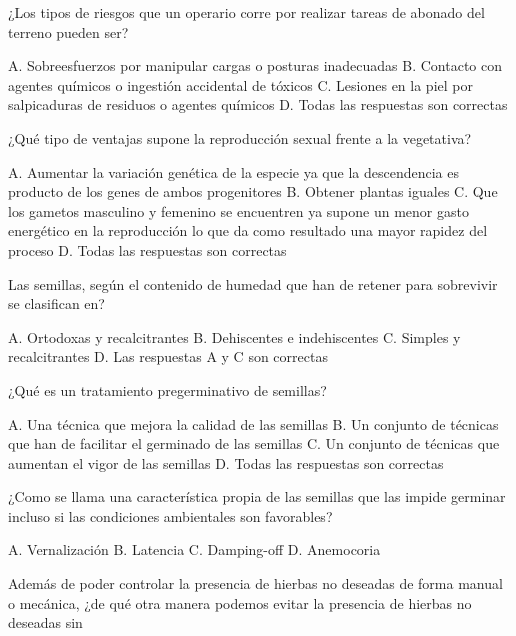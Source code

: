 \documentclass[11pt]{exam}
\begin{document}
{\begin{questions}
  \question ¿Los tipos de riesgos que un operario corre por  realizar tareas de abonado del
  terreno pueden ser?
  \begin{checkboxes}
    \choice A. Sobreesfuerzos por manipular cargas o posturas inadecuadas
    \choice B. Contacto con agentes químicos o ingestión accidental de tóxicos
    \choice C. Lesiones en la piel por salpicaduras de residuos o agentes químicos
    \CorrectChoice D. Todas las respuestas son correctas
  \end{checkboxes}
  \question ¿Qué tipo de ventajas supone la reproducción sexual frente a la
  vegetativa?
  \begin{checkboxes}
    \CorrectChoice A. Aumentar la variación genética de la especie ya que la
    descendencia es producto de los genes de ambos progenitores
    \choice B. Obtener plantas iguales
    \choice C. Que los gametos masculino y femenino se encuentren ya supone 
    un menor gasto energético en la reproducción lo que da como resultado una
    mayor rapidez del proceso
    \choice D. Todas las respuestas son correctas 
  \end{checkboxes}
  \question Las semillas, según el contenido de humedad que han de retener para
  sobrevivir se clasifican en?
  \begin{checkboxes}
    \CorrectChoice A. Ortodoxas y recalcitrantes
    \choice B. Dehiscentes e indehiscentes
    \choice C. Simples y recalcitrantes
    \choice D. Las respuestas A y C son correctas
  \end{checkboxes}
  \question ¿Qué es un tratamiento pregerminativo de semillas?
  \begin{checkboxes}
    \choice A. Una técnica que mejora la calidad de las semillas
    \CorrectChoice B. Un conjunto de técnicas que han de facilitar el germinado de las
    semillas
    \choice C. Un conjunto de técnicas que aumentan el vigor de las semillas
    \choice D. Todas las respuestas son correctas
  \end{checkboxes}
  \question ¿Como se llama una característica propia de las semillas que las impide germinar
  incluso si las condiciones ambientales son favorables?
  \begin{checkboxes}
    \choice A. Vernalización
    \CorrectChoice B. Latencia
    \choice C. Damping-off
    \choice D. Anemocoria
  \end{checkboxes}
  \newpage
  \question Además de poder controlar la presencia de hierbas no deseadas de forma manual o
  mecánica, ¿de qué otra manera podemos evitar la presencia de hierbas no deseadas sin

\end{questions}}
\end{document}
